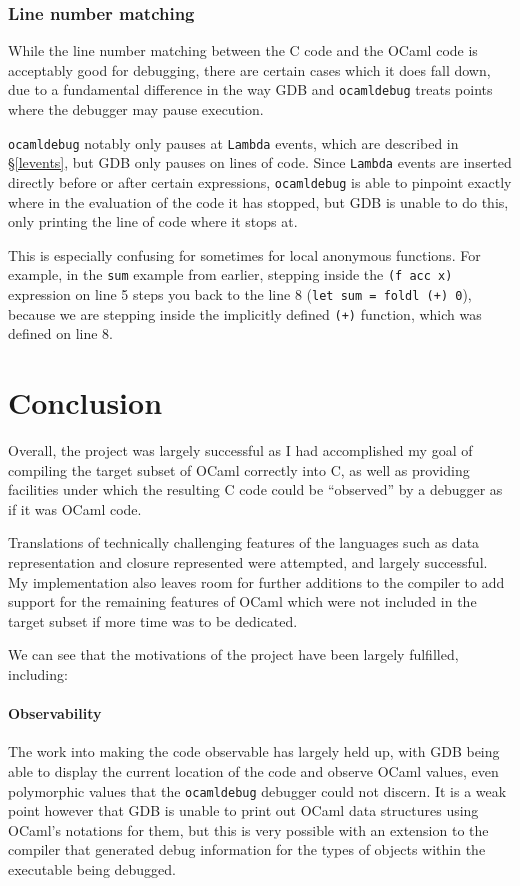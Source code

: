 \documentclass[12pt,a4paper,twoside,openright]{report}
\begin{document}
\subsection{Line number matching}

While the line number matching between the C code and the OCaml code is 
acceptably good for debugging, there are certain cases which it does fall down, 
due to a fundamental difference in the way GDB and \texttt{ocamldebug} treats 
points where the debugger may pause execution.

\texttt{ocamldebug} notably only pauses at \texttt{Lambda} events, which are
described in \S\ref{levents}, but GDB only pauses on lines of code. Since
\texttt{Lambda} events are inserted directly before or after certain
expressions, \texttt{ocamldebug} is able to pinpoint exactly where in the
evaluation of the code it has stopped, but GDB is unable to do this, only
printing the line of code where it stops at.

This is especially confusing for sometimes for local anonymous functions. For 
example, in the \texttt{sum} example from earlier, stepping inside the 
\texttt{(f acc x)} expression on line 5 steps you back to the line 8 
(\texttt{let sum = foldl (+) 0}), because we are stepping inside the implicitly 
defined \texttt{(+)} function, which was defined on line 8.

\chapter{Conclusion}

Overall, the project was largely successful as I had accomplished my goal of 
compiling the target subset of OCaml correctly into C, as well as providing 
facilities under which the resulting C code could be ``observed'' by a debugger 
as if it was OCaml code.

Translations of technically challenging features of the languages such as data 
representation and closure represented were attempted, and largely successful. 
My implementation also leaves room for further additions to the compiler to add 
support for the remaining features of OCaml which were not included in the 
target subset if more time was to be dedicated.

We can see that the motivations of the project have been largely fulfilled, 
including:

\subsubsection{Observability}
The work into making the code observable has largely held up, with GDB being 
able to display the current location of the code and observe OCaml values, even 
polymorphic values that the \texttt{ocamldebug} debugger could not discern. It 
is a weak point however that GDB is unable to print out OCaml data structures 
using OCaml's notations for them, but this is very possible with an extension 
to the compiler that generated debug information for the types of objects 
within the executable being debugged.
\end{document}
